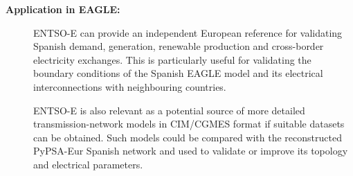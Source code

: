 \begin{description}
    \item[\textbf{Application in EAGLE:}]
    ENTSO-E can provide an independent European reference for validating
    Spanish demand, generation, renewable production and cross-border
    electricity exchanges. This is particularly useful for validating the
    boundary conditions of the Spanish EAGLE model and its electrical
    interconnections with neighbouring countries.

    ENTSO-E is also relevant as a potential source of more detailed
    transmission-network models in CIM/CGMES format if suitable datasets
    can be obtained. Such models could be compared with the reconstructed
    PyPSA-Eur Spanish network and used to validate or improve its topology
    and electrical parameters.

\end{description}